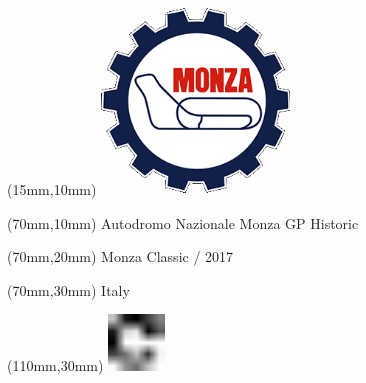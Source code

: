 \null\newpage
\begin{textblock*}{50mm}(15mm,10mm)%
\includegraphics[width=50mm]{LG/MON.png}
\end{textblock*}
\begin{textblock*}{130mm}(70mm,10mm)%
{\fontsize{20}{20}\selectfont Autodromo Nazionale Monza GP Historic}\\
\end{textblock*}
\begin{textblock*}{120mm}(70mm,20mm)%
{\fontsize{16}{16}\selectfont Monza Classic / 2017}\\
\end{textblock*}
\begin{textblock*}{120mm}(70mm,30mm)%
{\fontsize{12}{12}\selectfont Italy}
\end{textblock*}
\begin{textblock*}{30mm}(110mm,30mm)%
\centering
\includegraphics[height=15mm]{icons/fa-rotate-right.pdf}
\end{textblock*}
